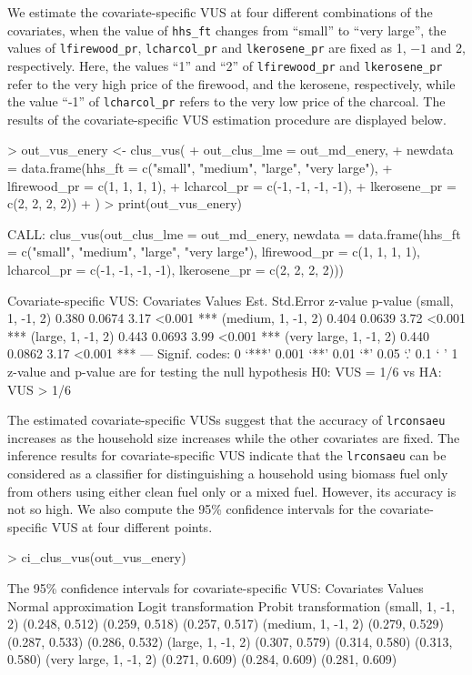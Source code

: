 We estimate the covariate-specific VUS at four different combinations of the covariates, when the value of \texttt{hhs\_ft} changes from ``small'' to ``very large'', the values of \texttt{lfirewood\_pr}, \texttt{lcharcol\_pr} and \texttt{lkerosene\_pr} are fixed as 1, $-1$ and 2, respectively. Here, the values ``1'' and ``2'' of \texttt{lfirewood\_pr} and \texttt{lkerosene\_pr} refer to the very high price of the firewood, and the kerosene, respectively, while the value ``-1'' of \texttt{lcharcol\_pr} refers to the very low price of the charcoal. The results of the covariate-specific VUS estimation procedure are displayed below.
\begin{example}
> out_vus_enery <- clus_vus(
+   out_clus_lme = out_md_enery,
+   newdata = data.frame(hhs_ft = c("small", "medium", "large", "very large"), 
+                        lfirewood_pr = c(1, 1, 1, 1), 
+                        lcharcol_pr = c(-1, -1, -1, -1), 
+                        lkerosene_pr = c(2, 2, 2, 2))
+ )
> print(out_vus_enery)

CALL: clus_vus(out_clus_lme = out_md_enery, newdata = data.frame(hhs_ft = c("small", 
    "medium", "large", "very large"), lfirewood_pr = c(1, 1, 
    1, 1), lcharcol_pr = c(-1, -1, -1, -1), lkerosene_pr = c(2, 
    2, 2, 2)))
 
Covariate-specific VUS: 
      Covariates Values  Est. Std.Error z-value p-value    
      (small, 1, -1, 2) 0.380    0.0674    3.17  <0.001 ***
     (medium, 1, -1, 2) 0.404    0.0639    3.72  <0.001 ***
      (large, 1, -1, 2) 0.443    0.0693    3.99  <0.001 ***
 (very large, 1, -1, 2) 0.440    0.0862    3.17  <0.001 ***
---
Signif. codes:    0 ‘***’ 0.001 ‘**’ 0.01 ‘*’ 0.05 ‘.’ 0.1 ‘ ’ 1
z-value and p-value are for testing the null hypothesis H0: VUS = 1/6 vs HA: VUS > 1/6
\end{example}
The estimated covariate-specific VUSs suggest that the accuracy of \texttt{lrconsaeu} increases as the household size increases while the other covariates are fixed. The inference results for covariate-specific VUS indicate that the \texttt{lrconsaeu} can be considered as a classifier for distinguishing a household using biomass fuel only from others using either clean fuel only or a mixed fuel. However, its accuracy is not so high. We also compute the 95\% confidence intervals for the covariate-specific VUS at four different points.
\begin{example}
> ci_clus_vus(out_vus_enery)

The 95\% confidence intervals for covariate-specific VUS:
   Covariates Values  Normal approximation  Logit transformation  Probit transformation
    (small, 1, -1, 2)       (0.248, 0.512)       (0.259, 0.518)         (0.257, 0.517)
   (medium, 1, -1, 2)       (0.279, 0.529)       (0.287, 0.533)         (0.286, 0.532)
    (large, 1, -1, 2)       (0.307, 0.579)       (0.314, 0.580)         (0.313, 0.580)
(very large, 1, -1, 2)      (0.271, 0.609)       (0.284, 0.609)         (0.281, 0.609)
\end{example}

